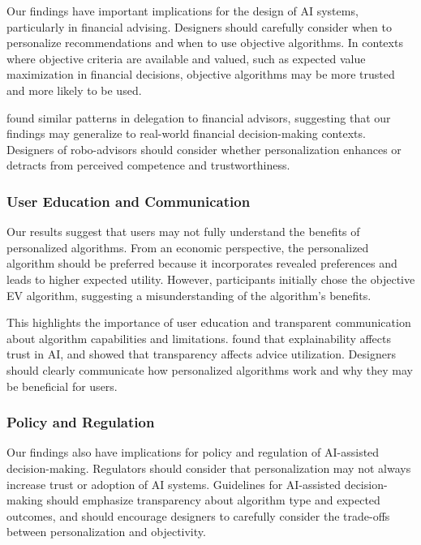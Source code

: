Our findings have important implications for the design of AI systems, particularly in financial advising. Designers should carefully consider when to personalize recommendations and when to use objective algorithms. In contexts where objective criteria are available and valued, such as expected value maximization in financial decisions, objective algorithms may be more trusted and more likely to be used.

\citet{holzmeister2023} found similar patterns in delegation to financial advisors, suggesting that our findings may generalize to real-world financial decision-making contexts. Designers of robo-advisors should consider whether personalization enhances or detracts from perceived competence and trustworthiness.

\subsubsection{User Education and Communication}

Our results suggest that users may not fully understand the benefits of personalized algorithms. From an economic perspective, the personalized algorithm should be preferred because it incorporates revealed preferences and leads to higher expected utility. However, participants initially chose the objective EV algorithm, suggesting a misunderstanding of the algorithm's benefits.

This highlights the importance of user education and transparent communication about algorithm capabilities and limitations. \citet{leightmann2023} found that explainability affects trust in AI, and \citet{ning2024} showed that transparency affects advice utilization. Designers should clearly communicate how personalized algorithms work and why they may be beneficial for users.

\subsubsection{Policy and Regulation}

Our findings also have implications for policy and regulation of AI-assisted decision-making. Regulators should consider that personalization may not always increase trust or adoption of AI systems. Guidelines for AI-assisted decision-making should emphasize transparency about algorithm type and expected outcomes, and should encourage designers to carefully consider the trade-offs between personalization and objectivity.


